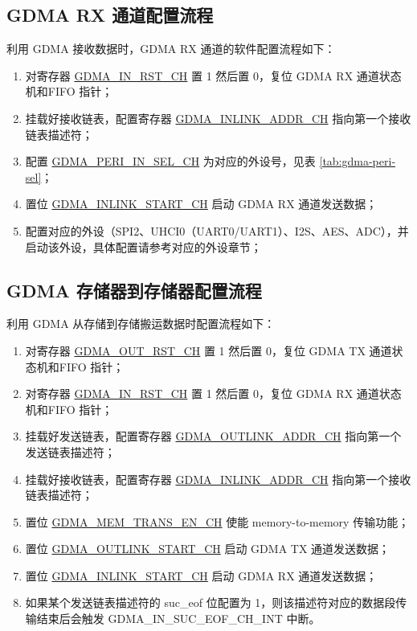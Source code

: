 \documentclass[main\_\_CN.tex]{subfiles}
\begin{document}
\subsection{GDMA RX 通道配置流程}
利用 GDMA 接收数据时，GDMA RX 通道的软件配置流程如下：
\begin{enumerate}
    \item 对寄存器 \hyperref[fielddesc:GDMAINRSTCHN]{GDMA\_IN\_RST\_CH} 置 1 然后置 0，复位 GDMA RX 通道状态机和FIFO 指针；
    \item 挂载好接收链表，配置寄存器 \hyperref[fielddesc:GDMAINLINKADDRCHN]{GDMA\_INLINK\_ADDR\_CH} 指向第一个接收链表描述符；
    \item 配置 \hyperref[fielddesc:GDMAPERIINSELCHN]{GDMA\_PERI\_IN\_SEL\_CH} 为对应的外设号，见表 \ref{tab:gdma-peri-sel}；
    \item 置位 \hyperref[fielddesc:GDMAINLINKSTARTCHN]{GDMA\_INLINK\_START\_CH} 启动 GDMA RX 通道发送数据；
    \item 配置对应的外设（SPI2、UHCI0（UART0/UART1）、I2S、AES、ADC），并启动该外设，具体配置请参考对应的外设章节；
\end{enumerate}   

\subsection{GDMA 存储器到存储器配置流程}
利用 GDMA 从存储到存储搬运数据时配置流程如下：
\begin{enumerate}
    \item 对寄存器 \hyperref[fielddesc:GDMAOUTRSTCHN]{GDMA\_OUT\_RST\_CH} 置 1 然后置 0，复位 GDMA TX 通道状态机和FIFO 指针；
    \item 对寄存器 \hyperref[fielddesc:GDMAINRSTCHN]{GDMA\_IN\_RST\_CH} 置 1 然后置 0，复位 GDMA RX 通道状态机和FIFO 指针；
    \item 挂载好发送链表，配置寄存器 \hyperref[fielddesc:GDMAOUTLINKADDRCHN]{GDMA\_OUTLINK\_ADDR\_CH} 指向第一个发送链表描述符；
    \item 挂载好接收链表，配置寄存器 \hyperref[fielddesc:GDMAINLINKADDRCHN]{GDMA\_INLINK\_ADDR\_CH} 指向第一个接收链表描述符；
    \item 置位 \hyperref[fielddesc:GDMAMEMTRANSENCHN]{GDMA\_MEM\_TRANS\_EN\_CH} 使能 memory-to-memory 传输功能；
    \item 置位 \hyperref[fielddesc:GDMAOUTLINKSTARTCHN]{GDMA\_OUTLINK\_START\_CH} 启动 GDMA TX 通道发送数据；
    \item 置位 \hyperref[fielddesc:GDMAINLINKSTARTCHN]{GDMA\_INLINK\_START\_CH} 启动 GDMA RX 通道发送数据；
    \item 如果某个发送链表描述符的 suc\_eof 位配置为 1，则该描述符对应的数据段传输结束后会触发 GDMA\_IN\_SUC\_EOF\_CH\_INT 中断。
\end{enumerate}   
\end{document}
